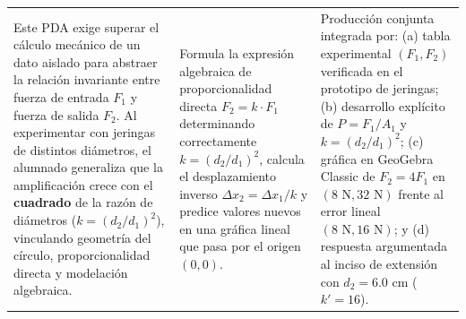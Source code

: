 \documentclass[spanish,letterpaper,landscape]{article}
\begin{document}
\vspace{-0.7pt}
\noindent\begin{tabularx}{\textwidth}{|>{\raggedright\arraybackslash}p{}|>{\raggedright\arraybackslash}p{}|>{\raggedright\arraybackslash}X|}
\hline
\rowcolor{gMid} \multicolumn{1}{|c|}{\textbf{\small Justificación}} & \multicolumn{1}{c|}{\textbf{\small Indicador}} & \multicolumn{1}{c|}{\textbf{\small Evidencia observable}} \\\hline
\small Este PDA exige superar el cálculo mecánico de un dato aislado para abstraer la relación invariante entre fuerza de entrada $F_1$ y fuerza de salida $F_2$. Al experimentar con jeringas de distintos diámetros, el alumnado generaliza que la amplificación crece con el \textbf{cuadrado} de la razón de diámetros ($k = (d_2/d_1)^2$), vinculando geometría del círculo, proporcionalidad directa y modelación algebraica. &
\small Formula la expresión algebraica de proporcionalidad directa $F_2 = k\cdot F_1$ determinando correctamente $k = (d_2/d_1)^2$, calcula el desplazamiento inverso $\Delta x_2 = \Delta x_1 / k$ y predice valores nuevos en una gráfica lineal que pasa por el origen $(0,0)$. &
\small Producción conjunta integrada por: (a) tabla experimental $(F_1, F_2)$ verificada en el prototipo de jeringas; (b) desarrollo explícito de $P = F_1/A_1$ y $k = (d_2/d_1)^2$; (c) gráfica en GeoGebra Classic de $F_2 = 4F_1$ en $(8\text{ N}, 32\text{ N})$ frente al error lineal $(8\text{ N}, 16\text{ N})$; y (d) respuesta argumentada al inciso de extensión con $d_2 = 6.0\text{ cm}$ ($k' = 16$). \\\hline
\end{tabularx}
\end{document}
